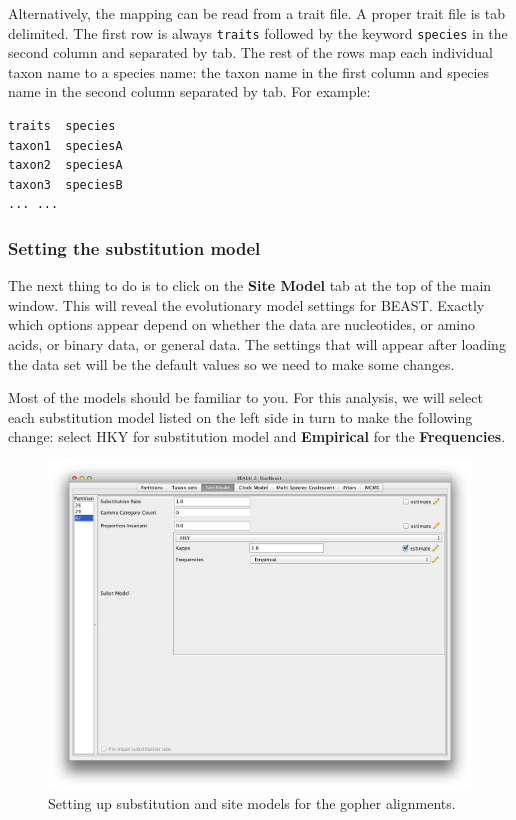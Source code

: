 \documentclass{article}
\begin{document}
Alternatively, the mapping can be read from a trait file.
A proper trait file is tab delimited. The first row is always \texttt{traits} followed by the keyword \texttt{species} in the second column and separated by tab. The rest of the rows map each individual taxon name to a species name: the taxon name in the first column and species name in the second column separated by tab. For example:

\begin{verbatim}
traits	species
taxon1	speciesA
taxon2	speciesA
taxon3	speciesB
... ...
\end{verbatim}



\subsubsection*{Setting the substitution model}

The next thing to do is to click on the {\bf Site Model} tab at the top of the
main window. This will reveal the evolutionary model settings for
BEAST. Exactly which options appear depend on whether the data are
nucleotides, or amino acids, or binary data, or general data.
The settings that will appear after loading the data set will
be the default values so we need to make some changes. 

Most of the models should be familiar to you. For this analysis, we
will select each substitution model listed on the 
left side in turn to make the following change: select HKY for substitution model
and \textbf{Empirical} for the \textbf{Frequencies}. 
\begin{figure}
\begin{center}

\includegraphics[scale=0.4]{figures/BEAUti_Site_Model}

\end{center}
\caption{\label{fig.sitemodel} Setting up substitution and site models for the gopher alignments.}
\end{figure}
\end{document}

